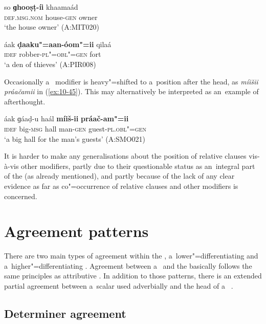 \begin{exe}
\ex
\label{ex:10-43}
\gll so \textbf{ɡhooṣṭ-íi} khaamaád \\
\textsc{def.msg.nom} house-\textsc{gen} owner  \\
\glt `the house owner' (A:MIT020)

\ex
\label{ex:10-44}
\gll áak \textbf{ḍaaku"=aan-óom"=ii} qilaá  \\
\textsc{idef} robber-\textsc{pl"=obl"=gen} fort  \\
\glt `a den of thieves' (A:PIR008)
\end{exe}


Occasionally a~ modifier is heavy"=shifted to a~position after the  head, as \textit{míišii práačamii} in (\ref{ex:10-45}). This may alternatively be interpreted as an~example of afterthought.

\begin{exe}
\ex
\label{ex:10-45}
\gll áak ɡáaḍ-u haál \textbf{míiš-ii} \textbf{práač-am"=ii} \\
\textsc{idef} big-\textsc{msg} hall man-\textsc{gen} guest-\textsc{pl.obl"=gen}  \\
\glt `a big hall for the man's guests' (A:SMO021)
\end{exe}


It is harder to make any generalisations about the position of relative clauses vis-à-vis other modifiers, partly due to their questionable status as an~integral part of the   (as already mentioned), and partly because of the lack of any clear evidence as far as co"=occurrence of relative clauses and other modifiers is concerned.


\section{Agreement patterns}
\label{sec:10-3}

There are two main types of agreement within the  , a~lower"=differentiating  and a~higher"=differentiating . Agreement between a~   and the    basically follows the same principles as attributive . In addition to those patterns, there is an extended partial agreement between a~scalar  used adverbially and the head of a~ .


\subsection{Determiner agreement}
\label{subsec:10-3-1}


